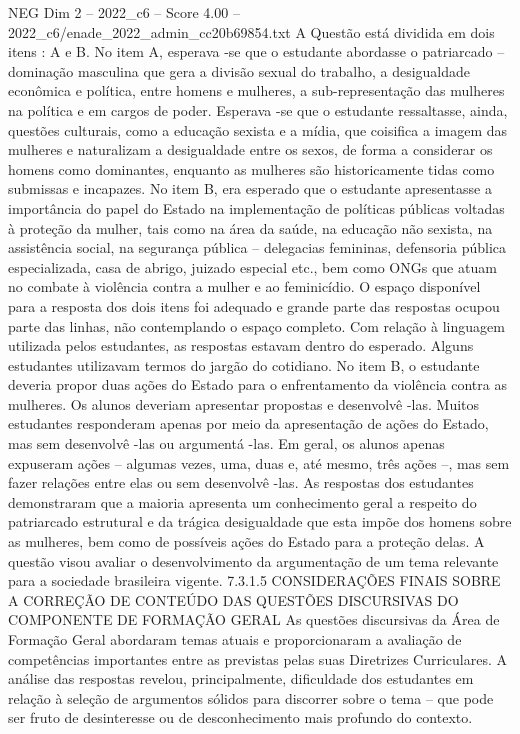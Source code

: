 \begin{textsample}{NEG Dim 2 – 2022\_c6 – Score 4.00 – 2022\_c6/enade\_2022\_admin\_cc20b69854.txt}
A Questão está dividida em dois itens : A e B.
No item A, esperava -se que o estudante abordasse o patriarcado – dominação masculina que gera a divisão sexual do trabalho, a desigualdade econômica e política, entre homens e mulheres, a sub-representação das mulheres na política e em cargos de poder.
Esperava -se que o estudante ressaltasse, ainda, questões culturais, como a educação sexista e a mídia, que coisifica a imagem das mulheres e naturalizam a desigualdade entre os sexos, de forma a considerar os homens como dominantes, enquanto as mulheres são historicamente tidas como submissas e incapazes.
No item B, era esperado que o estudante apresentasse a importância do papel do Estado na implementação de políticas públicas voltadas à proteção da mulher, tais como na área da saúde, na educação não sexista, na assistência social, na segurança pública – delegacias femininas, defensoria pública especializada, casa de abrigo, juizado especial etc., bem como ONGs que atuam no combate à violência contra a mulher e ao feminicídio.
O espaço disponível para a resposta dos dois itens foi adequado e grande parte das respostas ocupou parte das linhas, não contemplando o espaço completo.
Com relação à linguagem utilizada pelos estudantes, as respostas estavam dentro do esperado.
Alguns estudantes utilizavam termos do jargão do cotidiano.
No item B, o estudante deveria propor duas ações do Estado para o enfrentamento da violência contra as mulheres.
Os alunos deveriam apresentar propostas e desenvolvê -las.
Muitos estudantes responderam apenas por meio da apresentação de ações do Estado, mas sem desenvolvê -las ou argumentá -las.
Em geral, os alunos apenas expuseram ações – algumas vezes, uma, duas e, até mesmo, três ações –, mas sem fazer relações entre elas ou sem desenvolvê -las.
As respostas dos estudantes demonstraram que a maioria apresenta um conhecimento geral a respeito do patriarcado estrutural e da trágica desigualdade que esta impõe dos homens sobre as mulheres, bem como de possíveis ações do Estado para a proteção delas.
A questão visou avaliar o desenvolvimento da argumentação de um tema relevante para a sociedade brasileira vigente. 7.3.1.5 CONSIDERAÇÕES FINAIS SOBRE A CORREÇÃO DE CONTEÚDO DAS QUESTÕES DISCURSIVAS DO COMPONENTE DE FORMAÇÃO GERAL As questões discursivas da Área de Formação Geral abordaram temas atuais e proporcionaram a avaliação de competências importantes entre as previstas pelas suas Diretrizes Curriculares.
A análise das respostas revelou, principalmente, dificuldade dos estudantes em relação à seleção de argumentos sólidos para discorrer sobre o tema – que pode ser fruto de desinteresse ou de desconhecimento mais profundo do contexto.

\end{textsample}
